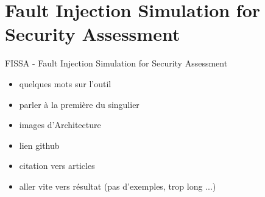 \section{Fault Injection Simulation for Security Assessment}

\begin{frame}{FISSA - Fault Injection Simulation for Security Assessment}
    \begin{itemize}
        \item quelques mots sur l'outil
        \item parler à la première du singulier
        \item images d'Architecture
        \item lien github
        \item citation vers articles
        \item aller vite vers résultat (pas d'exemples, trop long ...)
    \end{itemize}
\end{frame}